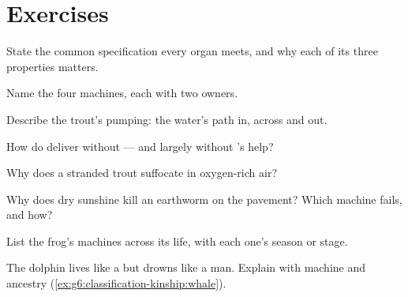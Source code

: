 \section{Exercises}

\begin{exercise}[$\star$]\label{exo:g7:how-animals-breathe:1}
State the common specification every  organ
meets, and why each of its three properties matters.
\end{exercise}

\begin{exercise}[$\star$]\label{exo:g7:how-animals-breathe:2}
Name the four machines, each with two owners.
\end{exercise}

\begin{exercise}[$\star$]\label{exo:g7:how-animals-breathe:3}
Describe the trout's pumping: the water's path in, across
and out.
\end{exercise}

\begin{exercise}[$\star$]\label{exo:g7:how-animals-breathe:4}
How do  deliver  without  --- and
largely without 's help?
\end{exercise}

\begin{exercise}[$\star$]\label{exo:g7:how-animals-breathe:5}
Why does a stranded trout suffocate in oxygen-rich air?
\end{exercise}

\begin{exercise}[$\star$]\label{exo:g7:how-animals-breathe:6}
Why does dry sunshine kill an earthworm on the pavement?
Which machine fails, and how?
\end{exercise}

\begin{exercise}[$\star\star$]\label{exo:g7:how-animals-breathe:7}
List the frog's  machines across its life, with
each one's season or stage.
\end{exercise}

\begin{exercise}[$\star\star$]\label{exo:g7:how-animals-breathe:8}
The dolphin lives like a  but drowns like a man.
Explain with machine and ancestry
(\cref{ex:g6:classification-kinship:whale}).
\end{exercise}

